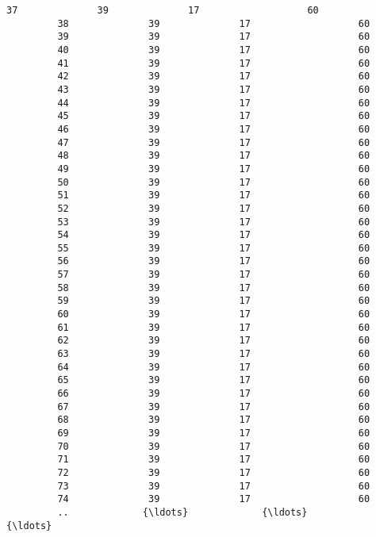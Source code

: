 \documentclass{article}
\begin{document}
\begin{Verbatim}[commandchars=\\\{\}]
         37              39              17                   60   
         38              39              17                   60   
         39              39              17                   60   
         40              39              17                   60   
         41              39              17                   60   
         42              39              17                   60   
         43              39              17                   60   
         44              39              17                   60   
         45              39              17                   60   
         46              39              17                   60   
         47              39              17                   60   
         48              39              17                   60   
         49              39              17                   60   
         50              39              17                   60   
         51              39              17                   60   
         52              39              17                   60   
         53              39              17                   60   
         54              39              17                   60   
         55              39              17                   60   
         56              39              17                   60   
         57              39              17                   60   
         58              39              17                   60   
         59              39              17                   60   
         60              39              17                   60   
         61              39              17                   60   
         62              39              17                   60   
         63              39              17                   60   
         64              39              17                   60   
         65              39              17                   60   
         66              39              17                   60   
         67              39              17                   60   
         68              39              17                   60   
         69              39              17                   60   
         70              39              17                   60   
         71              39              17                   60   
         72              39              17                   60   
         73              39              17                   60   
         74              39              17                   60   
         ..             {\ldots}             {\ldots}                  {\ldots}   

\end{Verbatim}
\end{document}
